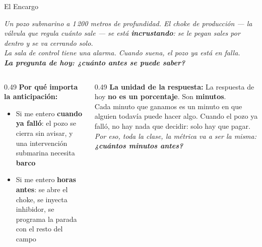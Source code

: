 \documentclass[aspectratio=169, 11pt]{beamer}
\begin{document}
\begin{frame}[shrink=14]{El Encargo}
  \vspace{-4pt}
  \begin{tcolorbox}[colback=arcaGray, colframe=arcaDark, boxrule=0pt, leftrule=3pt,
    arc=3pt, left=8pt, right=8pt, top=6pt, bottom=6pt]
    {\small\color{arcaDark}\itshape
     Un pozo submarino a 1\,200 metros de profundidad. El choke de producción
     --- la válvula que regula cuánto sale --- se está \textbf{incrustando}: se
     le pegan sales por dentro y se va cerrando solo.\\[5pt]
     La sala de control tiene una alarma. Cuando suena, el pozo ya está en falla.\\[5pt]
     \textbf{La pregunta de hoy: ¿cuánto antes se puede saber?}}
  \end{tcolorbox}
  \vspace{6pt}
  \begin{columns}[T]
    \begin{column}{0.49\textwidth}
      {\small\color{arcaDark}\bfseries\faDollarSign\hspace{5pt}Por qué importa la anticipación:}
      \vspace{3pt}
      {\footnotesize\color{textMuted}
      \begin{itemize}\setlength{\itemsep}{3pt}
        \item[{\color{arcaRed}\scriptsize\faExclamationTriangle}]
          Si me entero \textbf{cuando ya falló}: el pozo se cierra sin avisar,
          y una intervención submarina necesita \textbf{barco}
        \item[{\color{codeGreen}\scriptsize\faCheck}]
          Si me entero \textbf{horas antes}: se abre el choke, se inyecta
          inhibidor, se programa la parada con el resto del campo
      \end{itemize}
      }
    \end{column}
    \begin{column}{0.49\textwidth}
      {\small\color{arcaDark}\bfseries\faClock\hspace{5pt}La unidad de la respuesta:}
      \vspace{3pt}
      {\footnotesize\color{textMuted}
      La respuesta de hoy \textbf{no es un porcentaje}. Son \textbf{minutos}.\\[5pt]
      Cada minuto que ganamos es un minuto en que alguien todavía puede
      hacer algo. Cuando el pozo ya falló, no hay nada que decidir:
      solo hay que pagar.}
      \vspace{5pt}
      {\scriptsize\color{arcaDark}\itshape
        Por eso, toda la clase, la métrica va a ser la misma:
        \textbf{¿cuántos minutos antes?}}
    \end{column}
  \end{columns}
\end{frame}
\end{document}
